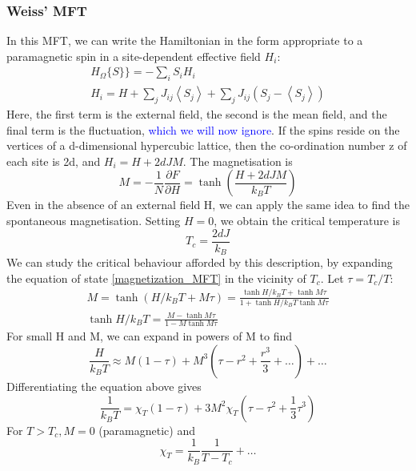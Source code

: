 \documentclass[12pt,titlepage]{article}
\numberwithin{equation}{section}
\begin{document}
\subsubsection{Weiss' MFT}
In this MFT, we can write the Hamiltonian in the form appropriate to a paramagnetic spin in a site-dependent effective field $H_i$:
\begin{equation}
\begin{array}{c}{H_{\Omega}\{S\} \}=-\sum_{i} S_{i} H_{i}} \\ {H_{i}=H+\sum_{j} J_{i j}\left\langle S_{j}\right\rangle+\sum_{j} J_{i j}\left(S_{j}-\left\langle S_{j}\right\rangle\right)}\end{array}
\end{equation}
Here, the first term is the external field, the second is the mean field, and the final term is the fluctuation, \textcolor{blue}{which we will now ignore}. If the spins reside on the vertices of a d-dimensional hypercubic lattice, then the co-ordination number z of each site is 2d, and $H_{i}=H+2 d J M$. The magnetisation is
\begin{equation}
\label{magnetization_MFT}
M=-\frac{1}{N} \frac{\partial F}{\partial H}=\tanh \left(\frac{H+2 d J M}{k_{B} T}\right)
\end{equation}
Even in the absence of an external field H, we can apply the same idea to find the spontaneous magnetisation. Setting $H=0$, we obtain the critical temperature is 
\begin{equation}
T_{c}=\frac{2 d J}{k_{B}}
\end{equation}
We can study the critical behaviour afforded by this description, by expanding the equation of state \ref{magnetization_MFT} in the vicinity of $T_{c} .$ Let $\tau=T_{c} / T$:
\begin{equation}
\begin{array}{c}{M=\tanh \left(H / k_{B} T+M \tau\right)=\frac{\tanh H / k_{B} T+\tanh M \tau}{1+\tanh H / k_{B} T \tanh M \tau}} \\ {\tanh H / k_{B} T=\frac{M-\tanh M \tau}{1-M \tanh M \tau}}\end{array}
\end{equation}
For small H and M, we can expand in powers of M to find
\begin{equation}
\frac{H}{k_{B} T} \approx M(1-\tau)+M^{3}\left(\tau-r^{2}+\frac{r^{3}}{3}+\ldots\right)+\ldots
\end{equation}
Differentiating the equation above gives
\begin{equation}
\frac{1}{k_{B} T}=\chi_{T}(1-\tau)+3 M^{2} \chi_{T}\left(\tau-\tau^{2}+\frac{1}{3} \tau^{3}\right)
\end{equation}
For $T>T_{c}, M=0$ (paramagnetic) and
\begin{equation}
\chi_{T}=\frac{1}{k_{B}} \frac{1}{T-T_{c}}+\ldots
\end{equation}
\end{document}
